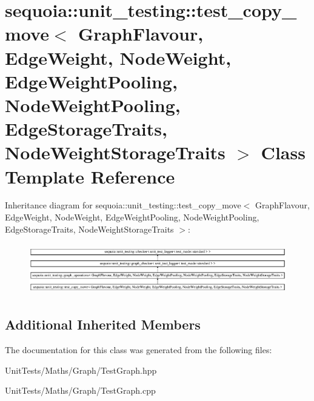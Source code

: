 \hypertarget{classsequoia_1_1unit__testing_1_1test__copy__move}{}\section{sequoia\+::unit\+\_\+testing\+::test\+\_\+copy\+\_\+move$<$ Graph\+Flavour, Edge\+Weight, Node\+Weight, Edge\+Weight\+Pooling, Node\+Weight\+Pooling, Edge\+Storage\+Traits, Node\+Weight\+Storage\+Traits $>$ Class Template Reference}
\label{classsequoia_1_1unit__testing_1_1test__copy__move}
Inheritance diagram for sequoia\+::unit\+\_\+testing\+::test\+\_\+copy\+\_\+move$<$ Graph\+Flavour, Edge\+Weight, Node\+Weight, Edge\+Weight\+Pooling, Node\+Weight\+Pooling, Edge\+Storage\+Traits, Node\+Weight\+Storage\+Traits $>$\+:\begin{figure}[H]
\begin{center}
\leavevmode
\includegraphics[height=2.251256cm]{classsequoia_1_1unit__testing_1_1test__copy__move}
\end{center}
\end{figure}
\subsection*{Additional Inherited Members}


The documentation for this class was generated from the following files\+:\begin{DoxyCompactItemize}
\item 
Unit\+Tests/\+Maths/\+Graph/Test\+Graph.\+hpp\item 
Unit\+Tests/\+Maths/\+Graph/Test\+Graph.\+cpp\end{DoxyCompactItemize}
